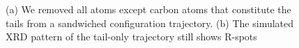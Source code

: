 \documentclass[journal=jpcbfk,manusciprt=article]{achemso}
\begin{document}
\begin{figure}
\begin{subfigure}{0.45\linewidth}
		\caption{}\label{fig:tails_rzplot}
	\end{subfigure}
	\caption{(a) We removed all atoms except carbon atoms that constitute the tails from a 
	sandwiched configuration trajectory. (b) The simulated XRD pattern of the
        tail-only trajectory still shows R-spots}\label{fig:tails}
  \end{figure}
\end{document}
